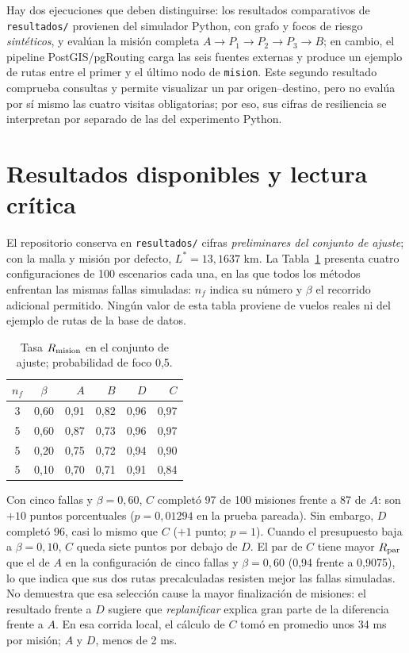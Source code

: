 \documentclass[journal,10pt]{IEEEtran}
\begin{document}
Hay dos ejecuciones que deben distinguirse: los resultados comparativos de
\texttt{resultados/} provienen del simulador Python, con grafo y focos de
riesgo \emph{sintéticos}, y evalúan la misión completa
$A\!\to\!P_1\!\to\!P_2\!\to\!P_3\!\to\!B$; en cambio, el pipeline
PostGIS/pgRouting carga las seis fuentes externas y produce un ejemplo de
rutas entre el primer y el último nodo de \texttt{mision}. Este segundo
resultado comprueba consultas y permite visualizar un par
origen--destino, pero no evalúa por sí mismo las cuatro visitas
obligatorias; por eso, sus cifras de resiliencia se interpretan por
separado de las del experimento Python.

\section{Resultados disponibles y lectura crítica}

El repositorio conserva en \texttt{resultados/} cifras
\emph{preliminares del conjunto de ajuste}; con la malla y misión por
defecto, $L^*=13{,}1637$ km. La Tabla~\ref{tab:resultados} presenta
cuatro configuraciones de 100 escenarios cada una, en las que todos los
métodos enfrentan las mismas fallas simuladas: $n_f$ indica su número y
$\beta$ el recorrido adicional permitido. Ningún valor de esta tabla
proviene de vuelos reales ni del ejemplo de rutas de la base de datos.

\begin{table}[!t]
\centering
\caption{Tasa $R_{\rm mision}$ en el conjunto de ajuste; probabilidad de foco 0,5.}
\label{tab:resultados}
\footnotesize
\begin{tabular}{@{}ccrrrr@{}}
\toprule
$n_f$ & $\beta$ & $A$ & $B$ & $D$ & $C$ \\
\midrule
3 & 0,60 & 0,91 & 0,82 & 0,96 & 0,97 \\
5 & 0,60 & 0,87 & 0,73 & 0,96 & 0,97 \\
5 & 0,20 & 0,75 & 0,72 & 0,94 & 0,90 \\
5 & 0,10 & 0,70 & 0,71 & 0,91 & 0,84 \\
\bottomrule
\end{tabular}
\end{table}

Con cinco fallas y $\beta=0{,}60$, $C$ completó 97 de 100 misiones frente a
87 de $A$: son $+10$ puntos porcentuales ($p=0{,}01294$ en la prueba
pareada). Sin embargo, $D$ completó 96, casi lo mismo que $C$ ($+1$ punto;
$p=1$). Cuando el presupuesto baja a $\beta=0{,}10$, $C$ queda siete puntos
por debajo de $D$. El par de $C$ tiene mayor $R_{\rm par}$ que el de $A$
en la configuración de cinco fallas y $\beta=0{,}60$ (0,94 frente a 0,9075),
lo que indica que sus
dos rutas precalculadas resisten mejor las fallas simuladas. No demuestra
que esa selección cause la mayor finalización de misiones: el resultado
frente a $D$ sugiere que \emph{replanificar} explica gran parte de la
diferencia frente a $A$. En esa corrida local, el cálculo de $C$ tomó en
promedio unos 34 ms por misión; $A$ y $D$, menos de 2 ms.
\end{document}
